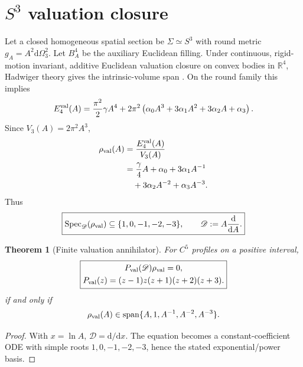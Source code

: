 \documentclass[aps,prd,reprint,nofootinbib,superscriptaddress]{revtex4-2}
\numberwithin{equation}{section}
\theoremstyle{definition}
\theoremstyle{plain}
\newtheorem{theorem}{Theorem}[section]
\newcommand{\R}{\mathbb R}
\newcommand{\dd}{\mathrm d}
\newcommand{\Sthree}{S^3}
\newcommand{\Bfour}{B^4}
\newcommand{\Dil}{\mathscr D}
\newcommand{\Spec}{\operatorname{Spec}}
\newcommand{\spanop}{\operatorname{span}}
\begin{document}
\section{\texorpdfstring{\(S^3\)}{S3} valuation closure}

Let a closed homogeneous spatial section be \(\Sigma\simeq\Sthree\) with round metric \(g_A=A^2\dd\Omega_3^2\).  Let \(\Bfour_A\) be the auxiliary Euclidean filling.  Under continuous, rigid-motion invariant, additive Euclidean valuation closure on convex bodies in \(\R^4\), Hadwiger theory gives the intrinsic-volume span \cite{Hadwiger1957,Schneider2014}.  On the round family this implies
\begin{equation}
E_4^{\rm val}(A)
=
\frac{\pi^2}{2}\gamma A^4
+
2\pi^2
\left(
\alpha_0A^3+3\alpha_1A^2+3\alpha_2A+\alpha_3
\right).
\end{equation}
Since \(V_3(A)=2\pi^2A^3\),
\begin{equation}
\begin{split}
\rho_{\rm val}(A)
&=\frac{E_4^{\rm val}(A)}{V_3(A)}\\
&=\frac{\gamma}{4}A+\alpha_0+3\alpha_1A^{-1}\\
&\quad+3\alpha_2A^{-2}+\alpha_3A^{-3}.
\end{split}
\end{equation}
Thus
\begin{equation}
\boxed{
\Spec_\Dil(\rho_{\rm val})\subseteq \{1,0,-1,-2,-3\},
\qquad
\Dil:=A\frac{\dd}{\dd A}.
}
\end{equation}

\begin{theorem}[Finite valuation annihilator]\label{thm:val-ann}
For \(C^5\) profiles on a positive interval,
\begin{equation}
\boxed{\begin{gathered}
P_{\rm val}(\Dil)\rho_{\rm val}=0,\\
P_{\rm val}(z)=(z-1)z(z+1)(z+2)(z+3).
\end{gathered}}
\end{equation}
if and only if
\begin{equation}
\rho_{\rm val}(A)\in
\spanop\{A,1,A^{-1},A^{-2},A^{-3}\}.
\end{equation}
\end{theorem}

\begin{proof}
With \(x=\ln A\), \(\Dil=\dd/\dd x\).  The equation becomes a constant-coefficient ODE with simple roots \(1,0,-1,-2,-3\), hence the stated exponential/power basis.
\end{proof}
\end{document}
